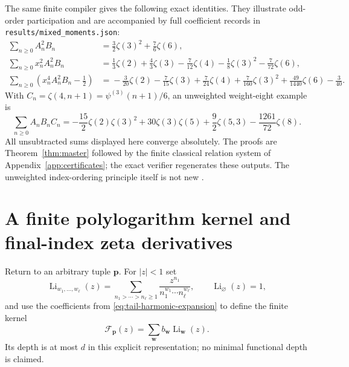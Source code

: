 \documentclass[11pt,letterpaper]{article}
\numberwithin{equation}{section}
\theoremstyle{definition}\newtheorem{definition}[theorem]{Definition}
\theoremstyle{remark}\newtheorem{remark}[theorem]{Remark}
\DeclareMathOperator{\Li}{Li}
\newcommand{\sref}[1]{\texttt{#1}}
\begin{document}
The same finite compiler gives the following exact identities.
They illustrate odd-order participation and are accompanied by
full coefficient records in \sref{results/mixed\_moments.json}:
\begin{align}
 \sum_{n\ge0}A_n^2B_n
   &={}\frac32\zeta(3)^2+\frac76\zeta(6),\label{eq:mixed-cubic0}\\
 \sum_{n\ge0}x_n^2A_n^2B_n
   &={}\frac13\zeta(2)+\frac43\zeta(3)-\frac7{12}\zeta(4)
                   -\frac18\zeta(3)^2-\frac7{72}\zeta(6),\label{eq:mixed-cubic2}\\
 \sum_{n\ge0}\left(x_n^4A_n^2B_n-\frac12\right)
   &={}-\frac3{20}\zeta(2)-\frac7{15}\zeta(3)+\frac7{24}\zeta(4)
       +\frac7{160}\zeta(3)^2+\frac{49}{1440}\zeta(6)-\frac3{40}.
 \label{eq:mixed-cubic4}
\end{align}
With $C_n=\zeta(4,n+1)=\psi^{(3)}(n+1)/6$, an unweighted
weight-eight example is
\begin{equation}\label{eq:ABC}
 \sum_{n\ge0}A_nB_nC_n
 =-\frac{15}{2}\zeta(2)\zeta(3)^2+30\zeta(3)\zeta(5)
                   +\frac92\zeta(5,3)-\frac{1261}{72}\zeta(8).
\end{equation}
All unsubtracted sums displayed here converge absolutely.
The proofs are Theorem~\ref{thm:master} followed by the finite
classical relation system of Appendix~\ref{app:certificates};
the exact verifier regenerates these outputs. The unweighted
index-ordering principle itself is not new \cite{Hoffman}.

\section{A finite polylogarithm kernel and final-index zeta derivatives}
\label{sec:polylog}

Return to an arbitrary tuple $\boldsymbol p$. For $|z|<1$ set
\[
 \Li_{w_1,\ldots,w_\ell}(z)
 =\sum_{n_1>\cdots>n_\ell\ge1}
       \frac{z^{n_1}}{n_1^{w_1}\cdots n_\ell^{w_\ell}},
 \qquad \Li_{\varnothing}(z)=1,
\]
and use the coefficients from \eqref{eq:tail-harmonic-expansion}
to define the finite kernel
\begin{equation}\label{eq:Fkernel}
 \mathcal F_{\boldsymbol p}(z)=\sum_{\boldsymbol w}
                                  b_{\boldsymbol w}\Li_{\boldsymbol w}(z).
\end{equation}
Its depth is at most $d$ in this explicit representation; no minimal
functional depth is claimed.
\end{document}
